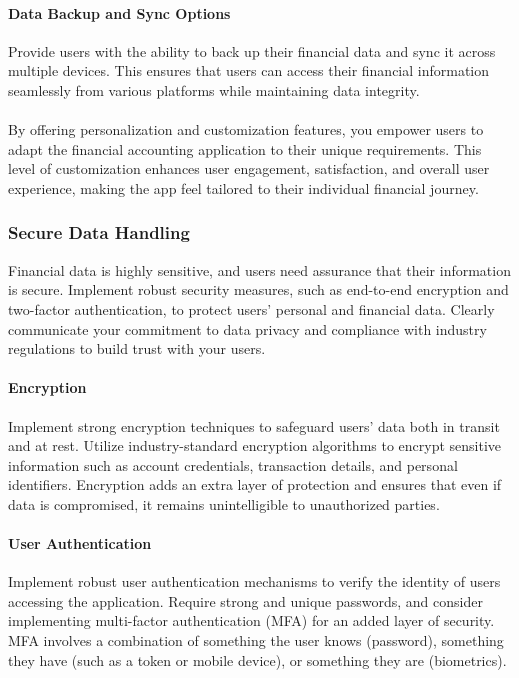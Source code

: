 \paragraph{Data Backup and Sync Options}
Provide users with the ability to back up their financial data and sync it across multiple devices. This ensures 
that users can access their financial information seamlessly from various platforms while maintaining data integrity.
\\
\\
By offering personalization and customization features, you empower users to adapt the financial accounting 
application to their unique requirements. This level of customization enhances user engagement, satisfaction, 
and overall user experience, making the app feel tailored to their individual financial journey.


\subsubsection{Secure Data Handling}
Financial data is highly sensitive, and users need assurance that their information is secure. Implement robust 
security measures, such as end-to-end encryption and two-factor authentication, to protect users' personal and 
financial data. Clearly communicate your commitment to data privacy and compliance with industry regulations to 
build trust with your users.

\paragraph{Encryption}
Implement strong encryption techniques to safeguard users' data both in transit and at rest. Utilize 
industry-standard encryption algorithms to encrypt sensitive information such as account credentials, transaction 
details, and personal identifiers. Encryption adds an extra layer of protection and ensures that even if data is 
compromised, it remains unintelligible to unauthorized parties.

\paragraph{User Authentication}
Implement robust user authentication mechanisms to verify the identity of users accessing the 
application. Require strong and unique passwords, and consider implementing multi-factor authentication (MFA) for 
an added layer of security. MFA involves a combination of something the user knows (password), something they have 
(such as a token or mobile device), or something they are (biometrics).

